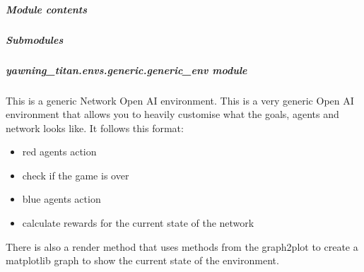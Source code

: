 \documentclass[letterpaper,10pt,english]{sphinxmanual}
\begin{document}
\subparagraph{Module contents}
\label{\detokenize{source/yawning_titan.envs.generic.wrappers:module-yawning_titan.envs.generic.wrappers}}\label{\detokenize{source/yawning_titan.envs.generic.wrappers:module-contents}}

\subparagraph{Submodules}
\label{\detokenize{source/yawning_titan.envs.generic:submodules}}

\subparagraph{yawning\_titan.envs.generic.generic\_env module}
\label{\detokenize{source/yawning_titan.envs.generic:module-yawning_titan.envs.generic.generic_env}}\label{\detokenize{source/yawning_titan.envs.generic:yawning-titan-envs-generic-generic-env-module}}
\sphinxAtStartPar
This is a generic Network Open AI environment. This is a very generic Open AI environment that allows you to heavily
customise what the goals, agents and network looks like. It follows this format:
\begin{itemize}
\item {}
\sphinxAtStartPar
red agents action

\item {}
\sphinxAtStartPar
check if the game is over

\item {}
\sphinxAtStartPar
blue agents action

\item {}
\sphinxAtStartPar
calculate rewards for the current state of the network

\end{itemize}

\sphinxAtStartPar
There is also a render method that uses methods from the graph2plot to create a matplotlib graph to show the current
state of the environment.
\end{document}
